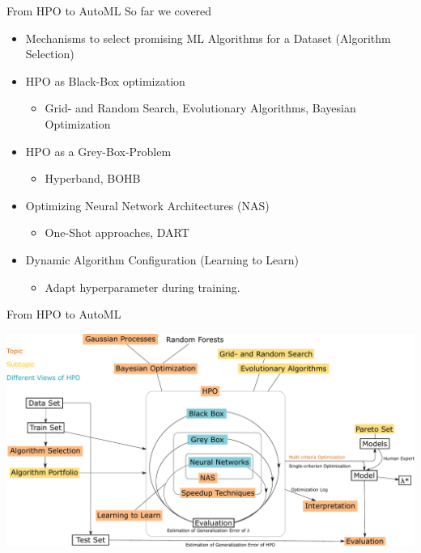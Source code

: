 

\usepackage{ulem}
\usepackage{pifont}

\subtitle{Wrap Up}




\maketitle



\begin{frame}{From HPO to AutoML}
  So far we covered
  \begin{itemize}
    \item Mechanisms to select promising ML Algorithms for a Dataset (Algorithm Selection)
    \item HPO as Black-Box optimization
    \begin{itemize}
      \item Grid- and Random Search, Evolutionary Algorithms, Bayesian Optimization
    \end{itemize}
    \item HPO as a Grey-Box-Problem
    \begin{itemize}
      \item Hyperband, BOHB
    \end{itemize}
    \item Optimizing Neural Network Architectures (NAS)
    \begin{itemize}
      \item One-Shot approaches, DART
    \end{itemize}
    \item Dynamic Algorithm Configuration (Learning to Learn)
    \begin{itemize}
      \item Adapt hyperparameter during training. 
    \end{itemize}
  \end{itemize}  
\end{frame}

\begin{frame}{From HPO to AutoML}
    \begin{center}
      \includegraphics[width = 0.9\linewidth]{images/drawing.pdf}  
    \end{center}
\end{frame}


